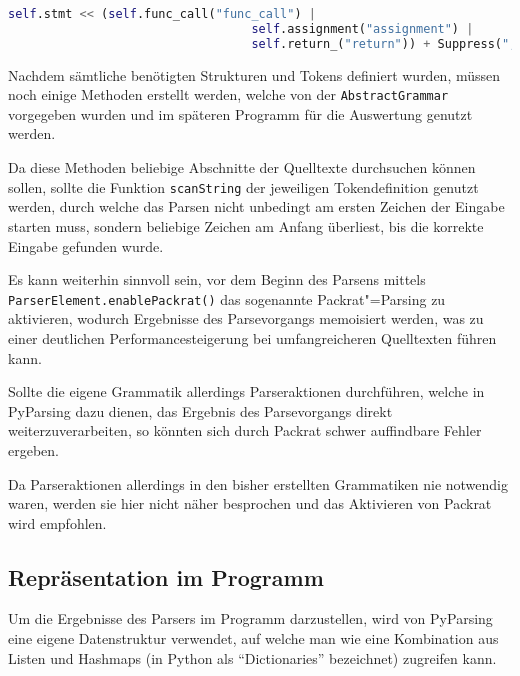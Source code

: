                 \begin{lstlisting}[caption={Befüllen einer Forward-Deklaration}, gobble=20, language=python]
                    self.stmt << (self.func_call("func_call") |
                                  self.assignment("assignment") |
                                  self.return_("return")) + Suppress(";")
                \end{lstlisting}

                Nachdem sämtliche benötigten Strukturen und
                Tokens definiert wurden,
                müssen noch einige Methoden erstellt werden,
                welche von der
                \lstinline{AbstractGrammar} vorgegeben wurden und
                im späteren Programm für die Auswertung genutzt werden.

                Da diese Methoden beliebige Abschnitte der Quelltexte durchsuchen können sollen,
                sollte die Funktion
                \lstinline{scanString} der jeweiligen Tokendefinition genutzt werden,
                durch welche das Parsen nicht unbedingt am ersten Zeichen der Eingabe starten muss,
                sondern beliebige Zeichen am Anfang überliest,
                bis die korrekte Eingabe gefunden wurde.

                Es kann weiterhin sinnvoll sein,
                vor dem Beginn des Parsens mittels
                \lstinline{ParserElement.enablePackrat()} das sogenannte Packrat"=Parsing zu aktivieren,
                wodurch Ergebnisse des Parsevorgangs memoisiert werden,
                was zu einer deutlichen Performancesteigerung bei umfangreicheren Quelltexten führen kann.

                Sollte die eigene Grammatik allerdings Parseraktionen durchführen,
                welche in PyParsing dazu dienen,
                das Ergebnis des Parsevorgangs direkt weiterzuverarbeiten,
                so könnten sich durch Packrat schwer auffindbare Fehler ergeben.

                Da Parseraktionen allerdings in den bisher erstellten Grammatiken nie notwendig waren,
                werden sie hier nicht näher besprochen und
                das Aktivieren von Packrat wird empfohlen.

        \subsection{Repräsentation im Programm}
            Um die Ergebnisse des Parsers im Programm darzustellen,
            wird von PyParsing eine eigene Datenstruktur verwendet,
            auf welche man wie eine Kombination aus Listen und
            Hashmaps
            (in Python als
            \foreignquote{english}{Dictionaries} bezeichnet)
            zugreifen kann.

